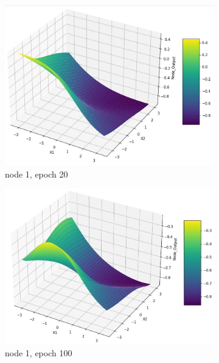 \documentclass[11pt]{article}
\begin{document}
\begin{figure}[h!]
	\begin{subfigure}[b]{0.3\textwidth}
	\centering
	\includegraphics[scale=0.14]{hidden2_n1_e20.jpg}
	\caption{node 1, epoch 20}
	\label{fig:fig2.1.6.3}
	\end{subfigure}
	\begin{subfigure}[b]{0.45\textwidth}
	\centering
	\includegraphics[scale=0.14]{hidden2_n1_e100.jpg}
	\caption{node 1, epoch 100}
	\label{fig:fig2.1.6.4}
	\end{subfigure}
	\begin{subfigure}[b]{0.45\textwidth}
	\centering

\end{subfigure}
\end{figure}
\end{document}
